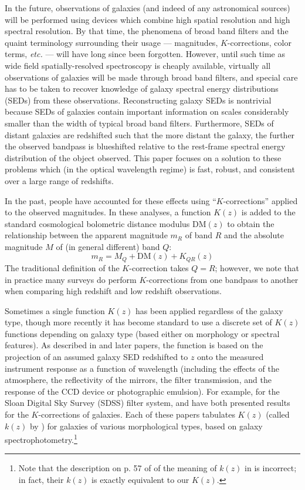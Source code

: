 \documentclass[10pt,preprint]{aastex}
\begin{document}
In the future, observations of galaxies (and indeed of any
astronomical sources) will be performed using devices which combine
high spatial resolution and high spectral resolution. By that time,
the phenomena of broad band filters and the quaint terminology
surrounding their usage --- magnitudes, $K$-corrections, color terms,
{\it etc.} --- will have long since been forgotten. However, until
such time as wide field spatially-resolved spectroscopy is cheaply
available, virtually all observations of galaxies will be made through
broad band filters, and special care has to be taken to recover
knowledge of galaxy spectral energy distributions (SEDs) from these
observations.  Reconstructing galaxy SEDs is nontrivial because SEDs
of galaxies contain important information on scales considerably
smaller than the width of typical broad band filters. Furthermore,
SEDs of distant galaxies are redshifted such that the more distant the
galaxy, the further the observed bandpass is blueshifted relative to
the rest-frame spectral energy distribution of the object observed.
This paper focuses on a solution to these problems which (in the
optical wavelength regime) is fast, robust, and consistent over a
large range of redshifts.

In the past, people have accounted for these effects using
``$K$-corrections'' applied to the observed magnitudes. In these
analyses, a function $K(z)$ is added to the standard cosmological
bolometric distance modulus $\mathrm{DM}(z)$ to obtain the
relationship between the apparent magnitude $m_R$ of band $R$ and the
absolute magnitude $M$ of (in general different) band $Q$:
\begin{equation}
\label{kcorrecteqn}
m_R = M_Q + \mathrm{DM}(z) + K_{QR}(z)
\end{equation}
The traditional definition of the $K$-correction takes $Q=R$; however,
we note that in practice many surveys do perform $K$-corrections from
one bandpass to another when comparing high redshift and low redshift
observations. 

Sometimes a single function $K(z)$ has been applied regardless of the
galaxy type, though more recently it has become standard to use a
discrete set of $K(z)$ functions depending on galaxy type (based
either on morphology or spectral features). As described in
\cite{oke68a} and later papers, the function is based on the
projection of an assumed galaxy SED redshifted to $z$ onto the
measured instrument response as a function of wavelength (including
the effects of the atmosphere, the reflectivity of the mirrors, the
filter transmission, and the response of the CCD device or
photographic emulsion). For example, for the Sloan Digital Sky Survey
(SDSS) filter system, \citet{frei94a} and \citet{fukugita95a} have
both presented results for the $K$-corrections of galaxies. Each of
these papers tabulates $K(z)$ (called $k(z)$ by \citealt{frei94a}) for
galaxies of various morphological types, based on galaxy
spectrophotometry.\footnote{Note that the description on p. 57 of
\citet{binney98a} of the meaning of $k(z)$ in \citet{frei94a} is
incorrect; in fact, their $k(z)$ is exactly equivalent to our $K(z)$.}
\end{document}
